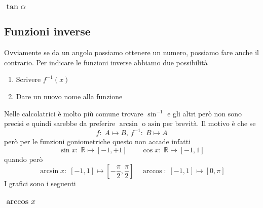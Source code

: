 \subsubsection{$\tan\alpha$}
\begin{center}
\end{center}

\subsection{Funzioni inverse}
Ovviamente se da un angolo possiamo ottenere un numero, possiamo fare anche il contrario. Per indicare
le funzioni inverse abbiamo due possibilità
\begin{enumerate}
  \item Scrivere $f^{-1}(x)$
  \item Dare un nuovo nome alla funzione
\end{enumerate}

Nelle calcolatrici è molto più comune trovare $\sin^{-1}$ e gli altri però non sono precisi e quindi
sarebbe da preferire $\arcsin$ o $\mathrm{asin}$ per brevità. Il motivo è che se
\begin{equation*}
  f:\;A\mapsto B,\,f^{-1}:\;B\mapsto A
\end{equation*}
però per le funzioni goniometriche questo non accade infatti
\begin{equation*}
  \sin x:\;\mathbb{R}\mapsto{[{-1},{+1}]} \qquad \cos x:\;\mathbb{R}\mapsto{[{-1},{1}]}
\end{equation*}
quando però
\begin{equation*}
  \arcsin x:\;{[{-1},{1}]}\mapsto{[{-\frac{\pi}{2}},{\frac{\pi}{2}}]} \quad 
  \arccos:\;{[{-1},{1}]}\mapsto{[0,{\pi}]}
\end{equation*}
I grafici sono i seguenti
\subsubsection{$\arccos x$}
\begin{center}
\end{center}
